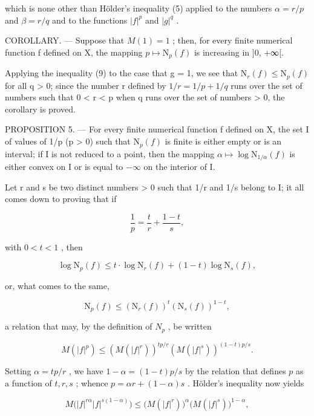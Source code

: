 which is none other than Hölder's inequality (5) applied to the numbers \(\alpha = r / p\) and \(\beta = r / q\) and to the functions \(|f|^p\) and \(|g|^q\) .

COROLLARY. --- Suppose that \(M(1) = 1\) ; then, for every finite numerical function f defined on X, the mapping \(p \mapsto \mathrm{N}_{p}(f)\) is increasing in {]}0, +∞{[}.

Applying the inequality (9) to the case that g = 1, we see that \(\mathrm{N}_{r}(f) \leqslant \mathrm{N}_{p}(f)\) for all q \textgreater{} 0; since the number r defined by \(1/r = 1/p + 1/q\) runs over the set of numbers such that 0 < r < p when q runs over the set of numbers \textgreater{} 0, the corollary is proved.

PROPOSITION 5. --- For every finite numerical function f defined on X, the set I of values of 1/p (p \textgreater{} 0) such that \(\mathrm{N}_{p}(f)\) is finite is either empty or is an interval; if I is not reduced to a point, then the mapping \(\alpha \mapsto \log \mathrm{N}_{1/\alpha}(f)\) is either convex on I or is equal to \(-\infty\) on the interior of I.

Let r and s be two distinct numbers \textgreater{} 0 such that 1/r and 1/s belong to I; it all comes down to proving that if

\[
{\frac {1}{p}} = {\frac {t}{r}} + {\frac {1 - t}{s}},
\]

with \(0 < t < 1\) , then

\[
\log \mathrm{N} _ {p} (f) \leqslant t \cdot \log \mathrm{N} _ {r} (f) + (1 - t) \log \mathrm{N} _ {s} (f),\tag{10}
\]

or, what comes to the same,

\[
\mathrm{N} _ {p} (f) \leqslant \left(\mathrm{N} _ {r} (f)\right) ^ {t} \left(\mathrm{N} _ {s} (f)\right) ^ {1 - t},\tag{11}
\]

a relation that may, by the definition of \(N_{p}\) , be written

\[
M (| f | ^ {p}) \leqslant \left(M (| f | ^ {r})\right) ^ {t p / r} \left(M (| f | ^ {s})\right) ^ {(1 - t) p / s}.\tag{12}
\]

Setting \(\alpha = tp / r\) , we have \(1 - \alpha = (1 - t)p / s\) by the relation that defines \(p\) as a function of \(t, r, s\) ; whence \(p = \alpha r + (1 - \alpha)s\) . Hölder's inequality now yields

\[
M \big (| f | ^ {r \alpha} | f | ^ {s (1 - \alpha)} \big) \leqslant \big (M (| f | ^ {r}) \big) ^ {\alpha} \big (M (| f | ^ {s}) \big) ^ {1 - \alpha},
\]

